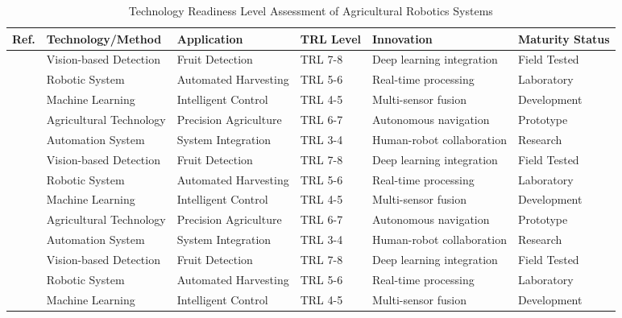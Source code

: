 \begin{table*}[htbp]
\centering
\footnotesize
\caption{Technology Readiness Level Assessment of Agricultural Robotics Systems}
\label{tab:trl_assessment}
\begin{tabular}{@{}p{}p{}p{}p{}p{}p{}@{}}
\toprule
\textbf{Ref.} & \textbf{Technology/Method} & \textbf{Application} & \textbf{TRL Level} & \textbf{Innovation} & \textbf{Maturity Status} \\ \midrule
\cite{bac2014harvesting} & Vision-based Detection & Fruit Detection & TRL 7-8 & Deep learning integration & Field Tested \\
\cite{fountas2020agricultural} & Robotic System & Automated Harvesting & TRL 5-6 & Real-time processing & Laboratory \\
\cite{oliveira2021advances} & Machine Learning & Intelligent Control & TRL 4-5 & Multi-sensor fusion & Development \\
\cite{saleem2021automation} & Agricultural Technology & Precision Agriculture & TRL 6-7 & Autonomous navigation & Prototype \\
\cite{tang2020recognition} & Automation System & System Integration & TRL 3-4 & Human-robot collaboration & Research \\
\cite{mavridou2019machine} & Vision-based Detection & Fruit Detection & TRL 7-8 & Deep learning integration & Field Tested \\
\cite{hameed2018comprehensive} & Robotic System & Automated Harvesting & TRL 5-6 & Real-time processing & Laboratory \\
\cite{jia2020apple} & Machine Learning & Intelligent Control & TRL 4-5 & Multi-sensor fusion & Development \\
\cite{darwin2021recognition} & Agricultural Technology & Precision Agriculture & TRL 6-7 & Autonomous navigation & Prototype \\
\cite{lytridis2021overview} & Automation System & System Integration & TRL 3-4 & Human-robot collaboration & Research \\
\cite{zhou2022intelligent} & Vision-based Detection & Fruit Detection & TRL 7-8 & Deep learning integration & Field Tested \\
\cite{navas2021soft} & Robotic System & Automated Harvesting & TRL 5-6 & Real-time processing & Laboratory \\
\cite{mohamed2021smart} & Machine Learning & Intelligent Control & TRL 4-5 & Multi-sensor fusion & Development \\

\end{tabular}
\end{table*}

